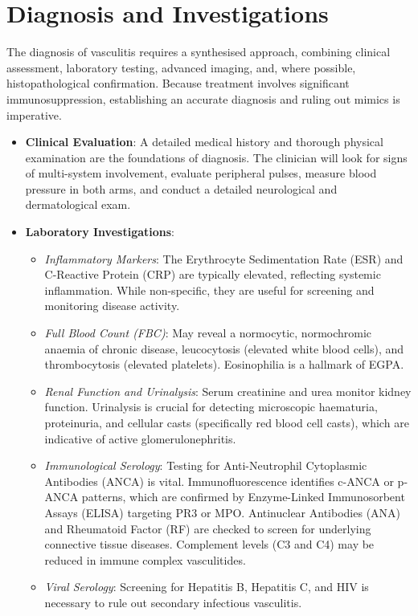 \section*{Diagnosis and Investigations}
The diagnosis of vasculitis requires a synthesised approach, combining clinical assessment, laboratory testing, advanced imaging, and, where possible, histopathological confirmation. Because treatment involves significant immunosuppression, establishing an accurate diagnosis and ruling out mimics is imperative.

\begin{itemize}
\item \textbf{Clinical Evaluation}: A detailed medical history and thorough physical examination are the foundations of diagnosis. The clinician will look for signs of multi-system involvement, evaluate peripheral pulses, measure blood pressure in both arms, and conduct a detailed neurological and dermatological exam.
\item \textbf{Laboratory Investigations}:
  \begin{itemize}
  \item \textit{Inflammatory Markers}: The Erythrocyte Sedimentation Rate (ESR) and C-Reactive Protein (CRP) are typically elevated, reflecting systemic inflammation. While non-specific, they are useful for screening and monitoring disease activity.
  \item \textit{Full Blood Count (FBC)}: May reveal a normocytic, normochromic anaemia of chronic disease, leucocytosis (elevated white blood cells), and thrombocytosis (elevated platelets). Eosinophilia is a hallmark of EGPA.
  \item \textit{Renal Function and Urinalysis}: Serum creatinine and urea monitor kidney function. Urinalysis is crucial for detecting microscopic haematuria, proteinuria, and cellular casts (specifically red blood cell casts), which are indicative of active glomerulonephritis.
  \item \textit{Immunological Serology}: Testing for Anti-Neutrophil Cytoplasmic Antibodies (ANCA) is vital. Immunofluorescence identifies c-ANCA or p-ANCA patterns, which are confirmed by Enzyme-Linked Immunosorbent Assays (ELISA) targeting PR3 or MPO. Antinuclear Antibodies (ANA) and Rheumatoid Factor (RF) are checked to screen for underlying connective tissue diseases. Complement levels (C3 and C4) may be reduced in immune complex vasculitides.
  \item \textit{Viral Serology}: Screening for Hepatitis B, Hepatitis C, and HIV is necessary to rule out secondary infectious vasculitis.

\end{itemize}
\end{itemize}
